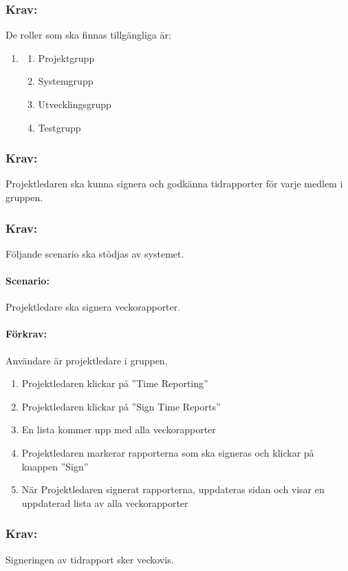 \documentclass[paper=a4, fontsize=11pt,twoside]{article}
\begin{document}
\subsubsection{Krav:}
De roller som ska finnas tillgängliga är:
\begin{enumerate}
\item[]
\begin{enumerate}
\item Projektgrupp
\item Systemgrupp
\item Utvecklingsgrupp
\item Testgrupp
\end{enumerate}
\end{enumerate}

\subsubsection{Krav:}
Projektledaren ska kunna signera och godkänna tidrapporter för varje medlem i gruppen.

\subsubsection{Krav:}
Följande scenario ska stödjas av systemet.
\paragraph{Scenario:}
Projektledare ska signera veckorapporter.
\paragraph{Förkrav:}
Användare är projektledare i gruppen.
\begin{enumerate}
\item Projektledaren klickar på ”Time Reporting”
\item Projektledaren klickar på ”Sign Time Reports”
\item En lista kommer upp med alla veckorapporter
\item Projektledaren markerar rapporterna som ska signeras och klickar på knappen ”Sign”
\item När Projektledaren signerat rapporterna, uppdateras sidan och visar en uppdaterad lista av alla veckorapporter
\end{enumerate}

\subsubsection{Krav:}
Signeringen av tidrapport sker veckovis.
\end{document}
